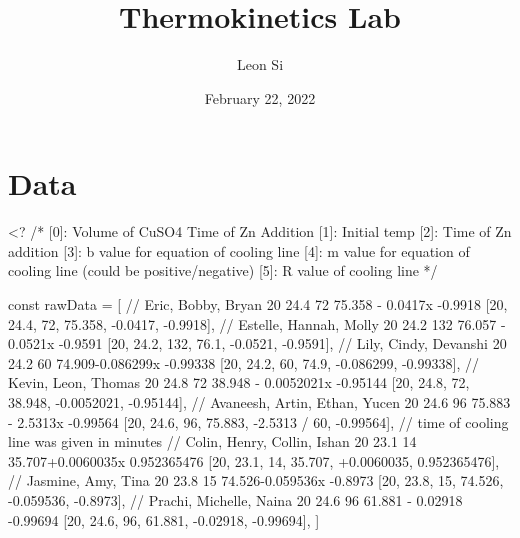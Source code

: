 \documentclass[12pt, notitlepage, letterpaper]{report}
\title{Thermokinetics Lab}
\author{Leon Si}
\date{February 22, 2022}
\begin{document}
\maketitle




\section*{Data}

<?
/*
[0]: Volume of CuSO4 Time of Zn Addition
[1]: Initial temp
[2]: Time of Zn addition
[3]: b value for equation of cooling line
[4]: m value for equation of cooling line (could be positive/negative)
[5]: R value of cooling line
*/

const rawData = [
	// Eric, Bobby, Bryan	20	24.4	72	75.358 - 0.0417x	-0.9918
	[20, 24.4, 72, 75.358, -0.0417, -0.9918],
	// Estelle, Hannah, Molly 	20	24.2	132	76.057 - 0.0521x	-0.9591
	[20, 24.2, 132, 76.1, -0.0521, -0.9591],
	// Lily, Cindy, Devanshi	20	24.2	60	74.909-0.086299x	-0.99338
	[20, 24.2, 60, 74.9, -0.086299, -0.99338],
	// Kevin, Leon, Thomas	20	24.8	72	38.948 - 0.0052021x	-0.95144
	[20, 24.8, 72, 38.948, -0.0052021, -0.95144],
	// Avaneesh, Artin, Ethan, Yucen	20	24.6	96	75.883 - 2.5313x	-0.99564
	[20, 24.6, 96, 75.883, -2.5313 / 60, -0.99564], // time of cooling line was given in minutes
	// Colin, Henry, Collin, Ishan	20	23.1	14	35.707+0.0060035x	0.952365476
	[20, 23.1, 14, 35.707, +0.0060035, 0.952365476],
	// Jasmine, Amy, Tina	20	23.8	15	74.526-0.059536x	-0.8973
	[20, 23.8, 15, 74.526, -0.059536, -0.8973],
	// Prachi, Michelle, Naina 	20	24.6	96	61.881 - 0.02918	-0.99694
	[20, 24.6, 96, 61.881, -0.02918, -0.99694],
]
\end{document}
